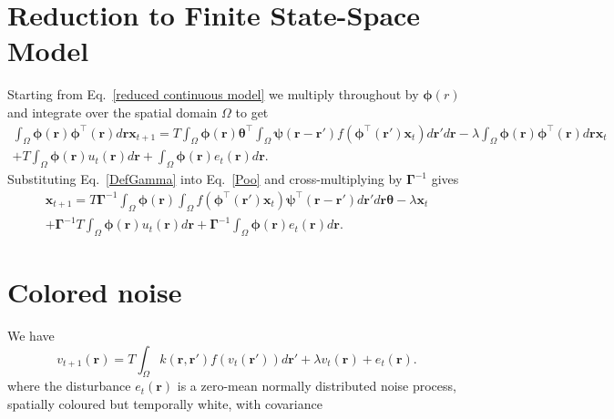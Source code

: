\documentclass[onecolumn,draftcls]{IEEEtran}
\begin{document}
\section{Reduction to Finite State-Space Model}\label{Simplifying Decomposition}
Starting from Eq.~\ref{reduced continuous model} we multiply throughout by $\boldsymbol{\phi}(r)$ and integrate over the spatial domain $\Omega$ to get
\begin{eqnarray}\label{Poo}
	\int_\Omega  {\boldsymbol{\phi} \left(\mathbf{r}\right)\boldsymbol{\phi}^{\top}\left(\mathbf{r}\right) d\mathbf{r}} \mathbf{x}_{t+1} = T \int_\Omega  {\boldsymbol{\phi} (\mathbf{r}) \boldsymbol{\theta}^{\top} \int_\Omega  {\boldsymbol{\psi}  \left(\mathbf{r}-\mathbf{r}'\right) f\left(\boldsymbol{\phi}^{\top}\left(\mathbf{r}'\right) \mathbf{x}_t \right)d\mathbf{r}'}d\mathbf{r}} - \lambda\int_\Omega {\boldsymbol{\phi}(\mathbf{r})\boldsymbol{\phi}^{\top}(\mathbf{r})d\mathbf{r}} \mathbf{x}_t \\
	+ T \int_\Omega{\boldsymbol{\phi} \left(\mathbf{r}\right) u_t\left(\mathbf{r}\right)d\mathbf{r}} + \int_\Omega{\boldsymbol{\phi} \left(\mathbf{r}\right) e_t\left(\mathbf{r}\right)d\mathbf{r}}.
\end{eqnarray}
Substituting Eq.~\ref{DefGamma} into Eq.~\ref{Poo} and cross-multiplying by $\boldsymbol{\Gamma}^{-1}$ gives 
\begin{eqnarray}\label{Homogeneous SS Model}
	\mathbf{x}_{t+1} = T\boldsymbol{\Gamma}^{ - 1}\int_\Omega {\boldsymbol{\phi}\left(\mathbf{r}\right) \int_\Omega {f\left(\boldsymbol{\phi}^{\top}\left(\mathbf{r}'\right)\mathbf{x}_t\right) \boldsymbol{\psi}^{\top} \left(\mathbf{r}-\mathbf{r}'\right)d\mathbf{r}'} d\mathbf{r}} \boldsymbol{\theta} - \lambda \mathbf{x}_t \\
	+ \boldsymbol{\Gamma}^{-1}T \int_\Omega{\boldsymbol{\phi} \left(\mathbf{r}\right) u_t\left(\mathbf{r}\right)d\mathbf{r}} + \boldsymbol{\Gamma}^{-1} \int_\Omega{\boldsymbol{\phi}\left(\mathbf{r}\right)e_t\left(\mathbf{r}\right)d\mathbf{r}}.
\end{eqnarray}

\section{Colored noise}
We have
\begin{equation}
v_{t + 1}\left( \mathbf{r} \right)  = T\int_\Omega  {k\left( {\mathbf{r}} , {\mathbf{r}'} \right)f\left( {{v_t}\left( \mathbf{r'} \right)} \right)d{\mathbf{r'}}} + \lambda v_t\left( {\mathbf{r}} \right) +e_t\left( {\mathbf{r}} \right).
\end{equation}
where the disturbance $e_t(\mathbf{r})$ is a zero-mean normally distributed noise process, spatially coloured but temporally white, with covariance 
\end{document}
